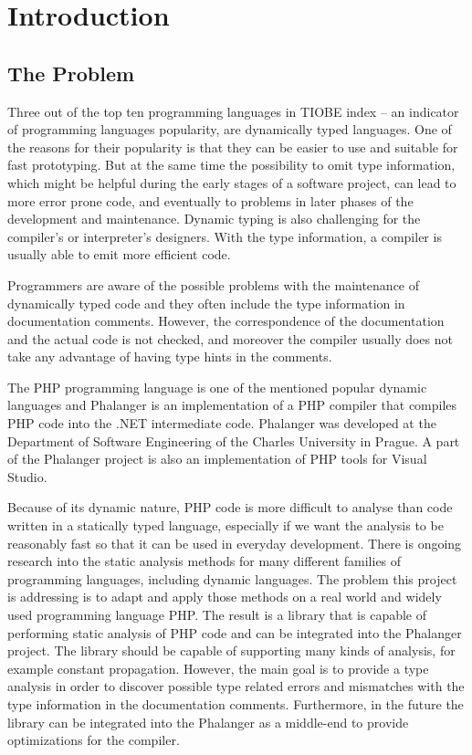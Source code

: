 \chapter{Introduction}

    \section{The Problem}
    
    Three out of the top ten programming languages in TIOBE index\cite{tiobe} -- 
    an indicator of programming languages popularity, are dynamically typed languages. 
    One of the reasons for their popularity is that they can be easier to 
    use and suitable for fast prototyping.
    But at the same time the possibility to omit type information, which might 
    be helpful during the early stages of a software project, can lead to more 
    error prone code, and eventually to problems in later phases of the 
    development and maintenance. Dynamic typing is also challenging for the 
    compiler's or interpreter's designers. With the type information, 
    a compiler is usually able to emit more efficient code.
    
    Programmers are aware of the possible problems with the maintenance of 
    dynamically typed code and they often include the type information in 
    documentation comments. However, the correspondence of the documentation 
    and the actual code is not checked, and moreover the compiler usually 
    does not take any advantage of having type hints in the comments.
    
    The PHP programming language is one of the mentioned popular dynamic 
    languages and Phalanger \cite{benda2006phalanger} is an implementation 
    of a PHP compiler that compiles PHP code into the .NET intermediate code. 
    Phalanger was developed at the Department of Software Engineering 
    of the Charles University in Prague. A part of the 
    Phalanger project is also an implementation of PHP tools 
    for Visual Studio.

    Because of its dynamic nature, PHP code is more difficult to analyse 
    than code written in a statically typed language, especially if we want the 
    analysis to be reasonably fast so that it can be used 
    in everyday development.  There is ongoing research into the 
    static analysis methods for many different families of programming languages, 
    including dynamic languages. The problem this project is addressing 
    is to adapt and apply those methods on a real world and widely 
    used programming language PHP. The result is a library that is capable of 
    performing static analysis of PHP code and can be integrated into 
    the Phalanger project. The library should be capable of supporting many 
    kinds of analysis, for example constant propagation. However, the main goal 
    is to provide a type analysis in order to discover possible type 
    related errors and mismatches with the type information in the 
    documentation comments. Furthermore, in the future the library 
    can be integrated into the Phalanger as a middle-end to provide 
    optimizations for the compiler.

